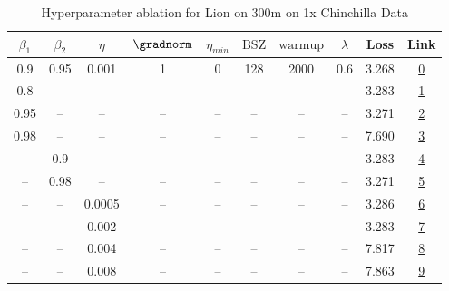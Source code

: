 \begin{table}[H]
\centering
\caption{Hyperparameter ablation for Lion on 300m on 1x Chinchilla Data}
\label{tab:ablation_lion_300m_on_1x_chinchilla_data}
\begin{tabular}{cccccccccc}
\toprule
$\beta_1$ & $\beta_2$ & $\eta$ & $\gradnorm$ & $\eta_{min}$ & $\mathrm{BSZ}$ & $\mathrm{warmup}$ & $\lambda$ & Loss & Link \\
\midrule
0.9 & 0.95 & 0.001 & 1 & 0 & 128 & 2000 & 0.6 & 3.268 & \href{https://wandb.ai/stanford-mercury/optimizer-scaling/runs/sweep-300m-6B-lion00979clr0.001-wd0.6-minlr0-warmup2000-b10.9-b2-81fdf3}{0} \\
\midrule
0.8 & -- & -- & -- & -- & -- & -- & -- & 3.283 & \href{https://wandb.ai/stanford-mercury/optimizer-scaling/runs/sweep-300m-6B-lionb6c8celr0.001-wd0.6-minlr0-warmup2000-b10.8-b2-b954bf}{1} \\
0.95 & -- & -- & -- & -- & -- & -- & -- & 3.271 & \href{https://wandb.ai/stanford-mercury/optimizer-scaling/runs/sweep-300m-6B-lion11c981lr0.001-wd0.6-minlr0-warmup2000-b10.95-b-4fef8e}{2} \\
0.98 & -- & -- & -- & -- & -- & -- & -- & 7.690 & \href{https://wandb.ai/stanford-mercury/optimizer-scaling/runs/sweep-300m-6B-lion5c8de5lr0.001-wd0.6-minlr0-warmup2000-b10.98-b-1d6304}{3} \\
-- & 0.9 & -- & -- & -- & -- & -- & -- & 3.283 & \href{https://wandb.ai/stanford-mercury/optimizer-scaling/runs/sweep-300m-6B-lionf81910lr0.001-wd0.6-minlr0-warmup2000-b10.9-b2-3a8ce5}{4} \\
-- & 0.98 & -- & -- & -- & -- & -- & -- & 3.271 & \href{https://wandb.ai/stanford-mercury/optimizer-scaling/runs/sweep-300m-6B-lion062393lr0.001-wd0.6-minlr0-warmup2000-b10.9-b2-aaa1ff}{5} \\
-- & -- & 0.0005 & -- & -- & -- & -- & -- & 3.286 & \href{https://wandb.ai/stanford-mercury/optimizer-scaling/runs/sweep-300m-6B-lionfb90dflr0.0005-wd0.6-minlr0-warmup2000-b10.9-b-8dee1b}{6} \\
-- & -- & 0.002 & -- & -- & -- & -- & -- & 3.283 & \href{https://wandb.ai/stanford-mercury/optimizer-scaling/runs/sweep-300m-6B-lion009506lr0.002-wd0.6-minlr0-warmup2000-b10.9-b2-9aa797}{7} \\
-- & -- & 0.004 & -- & -- & -- & -- & -- & 7.817 & \href{https://wandb.ai/stanford-mercury/optimizer-scaling/runs/sweep-300m-6B-lionfef5c5lr0.004-wd0.6-minlr0-warmup2000-b10.9-b2-2cf0da}{8} \\
-- & -- & 0.008 & -- & -- & -- & -- & -- & 7.863 & \href{https://wandb.ai/stanford-mercury/optimizer-scaling/runs/sweep-300m-6B-lion617912lr0.008-wd0.6-minlr0-warmup2000-b10.9-b2-9c49d8}{9} \\

\end{tabular}
\end{table}
